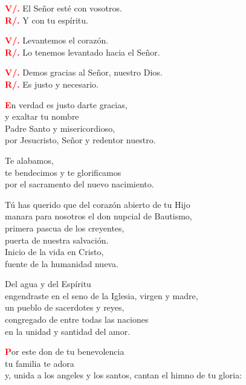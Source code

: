 \documentclass[12pt, letterpaper]{report}
\begin{document}
\noindent
\Large {\bfseries \textcolor{red}{V/.}} \hspace{0.5cm} El Se\~nor est\'e con vosotros. \\
\Large {\bfseries \textcolor{red}{R/.}} \hspace{0.5cm} Y con tu esp\'iritu. 

\noindent
\Large {\bfseries \textcolor{red}{V/.}} \hspace{0.5cm} Levantemos el coraz\'on. \\
\Large {\bfseries \textcolor{red}{R/.}} \hspace{0.5cm} Lo tenemos levantado hacia el Se\~nor. 

\noindent
\Large {\bfseries \textcolor{red}{V/.}} \hspace{0.5cm} Demos gracias al Se\~nor, nuestro Dios. \\
\Large {\bfseries \textcolor{red}{R/.}} \hspace{0.5cm} Es justo y necesario.

\lettrine[lines=1]{\bfseries \textcolor{red}{E}}{}\Large n verdad es justo darte gracias, \\ 
y exaltar tu nombre \\ 
Padre Santo y misericordioso, \\
por Jesucristo, Se\~nor y redentor nuestro.

Te alabamos, \\
te bendecimos y te glorificamos \\
por el sacramento del nuevo nacimiento.

T\'u has querido que del coraz\'on abierto de tu Hijo \\
manara para nosotros el don nupcial de Bautismo, \\
primera pascua de los creyentes, \\
puerta de nuestra salvaci\'on. \\
Inicio de la vida en Cristo, \\
fuente de la humanidad nueva.

\newpage

Del agua y del Esp\'iritu \\
engendraste en el seno de la Iglesia, virgen y madre, \\
un pueblo de sacerdotes y reyes, \\
congregado de entre todas las naciones \\
en la unidad y santidad del amor.

\lettrine[lines=1]{\bfseries \textcolor{red}{P}}{}\Large or este don de tu benevolencia \\
tu familia te adora \\
y, unida a los angeles y los santos,
cantan el himno de tu gloria:
\end{document}
